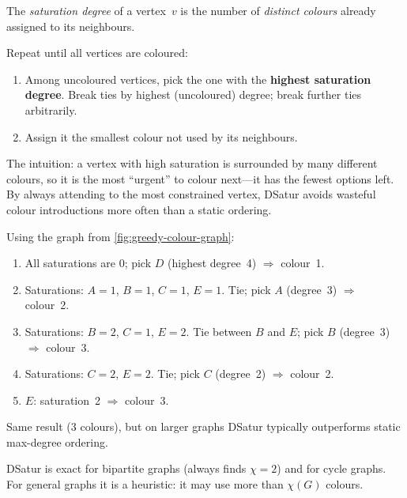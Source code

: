 \begin{definition}
\label{def:saturation-degree}
The \emph{saturation degree} of a vertex~$v$ is the number of
\emph{distinct colours} already assigned to its neighbours.
\end{definition}

\begin{definition}
\label{def:dsatur}
Repeat until all vertices are coloured:
\begin{enumerate}[nosep]
  \item Among uncoloured vertices, pick the one with the
        \textbf{highest saturation degree}.
        Break ties by highest (uncoloured) degree; break further
        ties arbitrarily.
  \item Assign it the smallest colour not used by its neighbours.
\end{enumerate}
\end{definition}

The intuition: a vertex with high saturation is surrounded by
many different colours, so it is the most ``urgent'' to colour
next---it has the fewest options left.  By always attending to the
most constrained vertex, DSatur avoids wasteful colour
introductions more often than a static ordering.

\begin{example}
\label{ex:dsatur}
Using the graph from \cref{fig:greedy-colour-graph}:
\begin{enumerate}[nosep]
  \item All saturations are 0; pick $D$ (highest degree~4)
        $\Rightarrow$ colour~1.
  \item Saturations: $A = 1$, $B = 1$, $C = 1$, $E = 1$.
        Tie; pick $A$ (degree~3) $\Rightarrow$ colour~2.
  \item Saturations: $B = 2$, $C = 1$, $E = 2$.
        Tie between $B$ and $E$; pick $B$ (degree~3)
        $\Rightarrow$ colour~3.
  \item Saturations: $C = 2$, $E = 2$.
        Tie; pick $C$ (degree~2) $\Rightarrow$ colour~2.
  \item $E$: saturation~2 $\Rightarrow$ colour~3.
\end{enumerate}
Same result (3 colours), but on larger graphs DSatur typically
outperforms static max-degree ordering.
\end{example}

\begin{remark}
DSatur is exact for bipartite graphs (always finds $\chi = 2$)
and for cycle graphs.  For general graphs it is a heuristic:
it may use more than $\chi(G)$ colours.
\end{remark}


